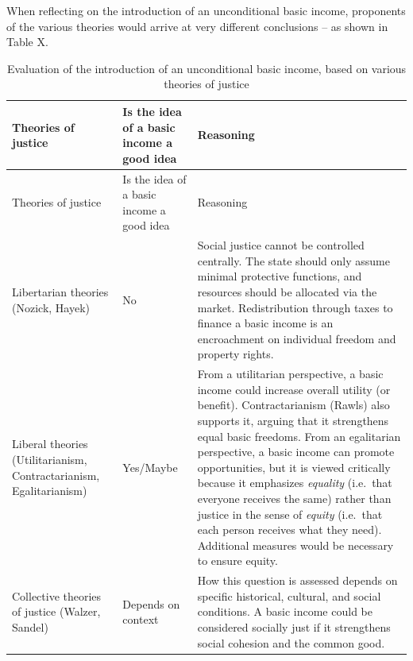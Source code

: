 \documentclass[
  a4paper,
  openany]{book}
\begin{document}
When reflecting on the introduction of an unconditional basic income,
proponents of the various theories would arrive at very different
conclusions -- as shown in Table X.

\begin{longtable}[]{@{}
  >{\raggedright\arraybackslash}p{}
  >{\raggedright\arraybackslash}p{}
  >{\raggedright\arraybackslash}p{}@{}}
\caption{Evaluation of the introduction of an unconditional basic
income, based on various theories of justice}\tabularnewline
\toprule\noalign{}
\begin{minipage}[b]{\linewidth}\raggedright
Theories of justice
\end{minipage} & \begin{minipage}[b]{\linewidth}\raggedright
Is the idea of a basic income a good idea
\end{minipage} & \begin{minipage}[b]{\linewidth}\raggedright
Reasoning
\end{minipage} \\
\midrule\noalign{}
\endfirsthead
\toprule\noalign{}
\begin{minipage}[b]{\linewidth}\raggedright
Theories of justice
\end{minipage} & \begin{minipage}[b]{\linewidth}\raggedright
Is the idea of a basic income a good idea
\end{minipage} & \begin{minipage}[b]{\linewidth}\raggedright
Reasoning
\end{minipage} \\
\midrule\noalign{}
\endhead
\bottomrule\noalign{}
\endlastfoot
Libertarian theories (Nozick, Hayek) & No & Social justice cannot be
controlled centrally. The state should only assume minimal protective
functions, and resources should be allocated via the market.
Redistribution through taxes to finance a basic income is an
encroachment on individual freedom and property rights. \\
Liberal theories (Utilitarianism, Contractarianism, Egalitarianism) &
Yes/Maybe & From a utilitarian perspective, a basic income could
increase overall utility (or benefit). Contractarianism (Rawls) also
supports it, arguing that it strengthens equal basic freedoms. From an
egalitarian perspective, a basic income can promote opportunities, but
it is viewed critically because it emphasizes \emph{equality} (i.e.~that
everyone receives the same) rather than justice in the sense of
\emph{equity} (i.e.~that each person receives what they need).
Additional measures would be necessary to ensure equity. \\
Collective theories of justice (Walzer, Sandel) & Depends on context &
How this question is assessed depends on specific historical, cultural,
and social conditions. A basic income could be considered socially just
if it strengthens social cohesion and the common good. \\
\end{longtable}
\end{document}
